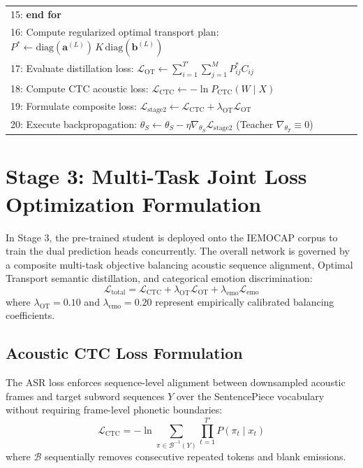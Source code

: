 \begin{table}[htbp]
\begin{tabular}{p{14.5cm}}
15: \textbf{end for} \\
16: Compute regularized optimal transport plan: $P^* \leftarrow \text{diag}(\mathbf{a}^{(L)}) \, K \, \text{diag}(\mathbf{b}^{(L)})$ \\
17: Evaluate distillation loss: $\mathcal{L}_{\text{OT}} \leftarrow \sum_{i=1}^{T'} \sum_{j=1}^M P^*_{ij} C_{ij}$ \\
18: Compute CTC acoustic loss: $\mathcal{L}_{\text{CTC}} \leftarrow -\ln P_{\text{CTC}}(W \mid X)$ \\
19: Formulate composite loss: $\mathcal{L}_{\text{stage2}} \leftarrow \mathcal{L}_{\text{CTC}} + \lambda_{\text{OT}} \mathcal{L}_{\text{OT}}$ \\
20: Execute backpropagation: $\theta_S \leftarrow \theta_S - \eta \nabla_{\theta_S} \mathcal{L}_{\text{stage2}}$ \quad (Teacher $\nabla_{\theta_T} \equiv 0$) \\
\bottomrule
\end{tabular}
\end{table}

\section{Stage 3: Multi-Task Joint Loss Optimization Formulation}
In Stage 3, the pre-trained student is deployed onto the IEMOCAP corpus to train the dual prediction heads concurrently. The overall network is governed by a composite multi-task objective balancing acoustic sequence alignment, Optimal Transport semantic distillation, and categorical emotion discrimination:
\begin{equation}
    \mathcal{L}_{\text{total}} = \mathcal{L}_{\text{CTC}} + \lambda_{\text{OT}} \mathcal{L}_{\text{OT}} + \lambda_{\text{emo}} \mathcal{L}_{\text{emo}}
\end{equation}
where $\lambda_{\text{OT}} = 0.10$ and $\lambda_{\text{emo}} = 0.20$ represent empirically calibrated balancing coefficients.

\subsection{Acoustic CTC Loss Formulation}
The ASR loss enforces sequence-level alignment between downsampled acoustic frames and target subword sequences $Y$ over the SentencePiece vocabulary without requiring frame-level phonetic boundaries:
\begin{equation}
    \mathcal{L}_{\text{CTC}} = - \ln \sum_{\pi \in \mathcal{B}^{-1}(Y)} \prod_{t=1}^{T'} P(\pi_t \mid x_t)
\end{equation}
where $\mathcal{B}$ sequentially removes consecutive repeated tokens and blank emissions.

